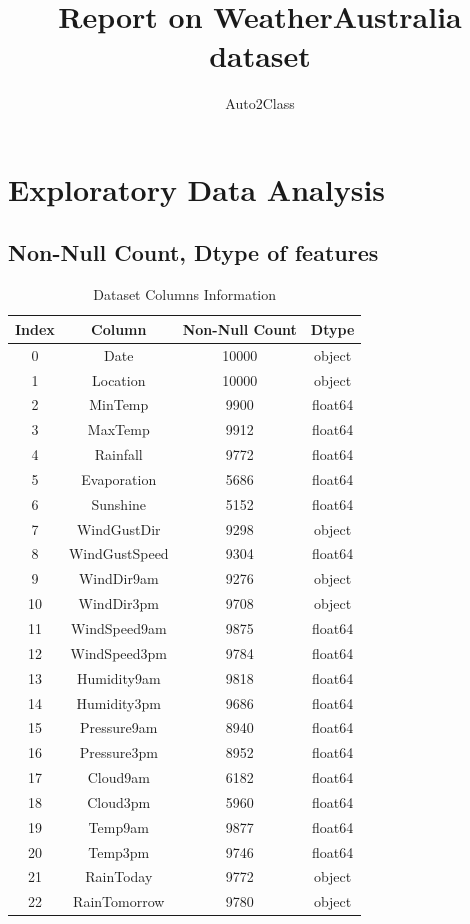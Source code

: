 \documentclass{article}%
\title{Report on WeatherAustralia dataset}%
\author{Auto2Class}%
\begin{document}
%
\normalsize%
\maketitle%
\newpage%
\tableofcontents%
\newpage%
\section{Exploratory Data Analysis}%
\label{sec:ExploratoryDataAnalysis}%
\subsection{Non{-}Null Count, Dtype of features}%
\label{subsec:Non{-}NullCount,Dtypeoffeatures}%


\begin{table}[h!]%
\caption{Dataset Columns Information}%
\vspace{0.2cm}%
\centering%
\begin{tabular}{|c||c||c||c|}%
\hline%
Index&Column&Non{-}Null Count&Dtype\\%
\hline%
0&Date&10000&object\\%
1&Location&10000&object\\%
2&MinTemp&9900&float64\\%
3&MaxTemp&9912&float64\\%
4&Rainfall&9772&float64\\%
5&Evaporation&5686&float64\\%
6&Sunshine&5152&float64\\%
7&WindGustDir&9298&object\\%
8&WindGustSpeed&9304&float64\\%
9&WindDir9am&9276&object\\%
10&WindDir3pm&9708&object\\%
11&WindSpeed9am&9875&float64\\%
12&WindSpeed3pm&9784&float64\\%
13&Humidity9am&9818&float64\\%
14&Humidity3pm&9686&float64\\%
15&Pressure9am&8940&float64\\%
16&Pressure3pm&8952&float64\\%
17&Cloud9am&6182&float64\\%
18&Cloud3pm&5960&float64\\%
19&Temp9am&9877&float64\\%
20&Temp3pm&9746&float64\\%
21&RainToday&9772&object\\%
22&RainTomorrow&9780&object\\%
\hline%
\end{tabular}%
\end{table}
\end{document}
